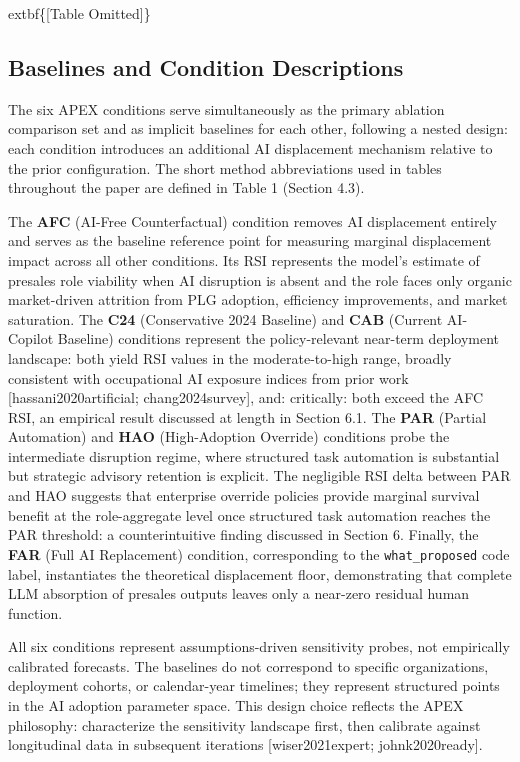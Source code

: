 \documentclass[10pt, conference]{IEEEtran}
\begin{document}
	extbf\{[Table Omitted]\}

\subsection{Baselines and Condition Descriptions}

\label{sec:baselines_and_condition_descriptions}

The six APEX conditions serve simultaneously as the primary ablation comparison set and as implicit baselines for each other, following a nested design: each condition introduces an additional AI displacement mechanism relative to the prior configuration. The short method abbreviations used in tables throughout the paper are defined in Table 1 (Section 4.3).

The \textbf{AFC} (AI-Free Counterfactual) condition removes AI displacement entirely and serves as the baseline reference point for measuring marginal displacement impact across all other conditions. Its RSI represents the model's estimate of presales role viability when AI disruption is absent and the role faces only organic market-driven attrition from PLG adoption, efficiency improvements, and market saturation. The \textbf{C24} (Conservative 2024 Baseline) and \textbf{CAB} (Current AI-Copilot Baseline) conditions represent the policy-relevant near-term deployment landscape: both yield RSI values in the moderate-to-high range, broadly consistent with occupational AI exposure indices from prior work [hassani2020artificial; chang2024survey], and: critically: both exceed the AFC RSI, an empirical result discussed at length in Section 6.1. The \textbf{PAR} (Partial Automation) and \textbf{HAO} (High-Adoption Override) conditions probe the intermediate disruption regime, where structured task automation is substantial but strategic advisory retention is explicit. The negligible RSI delta between PAR and HAO suggests that enterprise override policies provide marginal survival benefit at the role-aggregate level once structured task automation reaches the PAR threshold: a counterintuitive finding discussed in Section 6. Finally, the \textbf{FAR} (Full AI Replacement) condition, corresponding to the \texttt{what\_proposed} code label, instantiates the theoretical displacement floor, demonstrating that complete LLM absorption of presales outputs leaves only a near-zero residual human function.

All six conditions represent assumptions-driven sensitivity probes, not empirically calibrated forecasts. The baselines do not correspond to specific organizations, deployment cohorts, or calendar-year timelines; they represent structured points in the AI adoption parameter space. This design choice reflects the APEX philosophy: characterize the sensitivity landscape first, then calibrate against longitudinal data in subsequent iterations [wiser2021expert; johnk2020ready].
\end{document}
